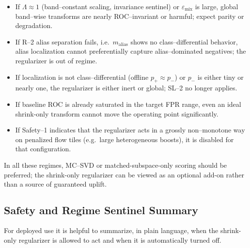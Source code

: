 \begin{itemize}[nosep]
  \item If $\Lambda\approx 1$ (band--constant scaling, invariance sentinel) or $\varepsilon_{\text{mix}}$ is large, global band--wise transforms are nearly ROC--invariant or harmful; expect parity or degradation.
  \item If R--2 alias separation fails, i.e.\ $m_{\text{alias}}$ shows no class--differential behavior, alias localization cannot preferentially capture alias--dominated negatives; the regularizer is out of regime.
  \item If localization is not class--differential (offline $p_+\approx p_-$) or $p_-$ is either tiny or nearly one, the regularizer is either inert or global; SL--2 no longer applies.
  \item If baseline ROC is already saturated in the target FPR range, even an ideal shrink-only transform cannot move the operating point significantly.
  \item If Safety--1 indicates that the regularizer acts in a grossly non--monotone way on penalized flow tiles (e.g.\ large heterogeneous boosts), it is disabled for that configuration.
\end{itemize}

In all these regimes, MC--SVD or matched-subspace-only scoring should be preferred; the shrink-only regularizer can be viewed as an optional add-on rather than a source of guaranteed uplift.

\subsection{Safety and Regime Sentinel Summary}

For deployed use it is helpful to summarize, in plain language, when the shrink-only regularizer is allowed to act and when it is automatically turned off.

